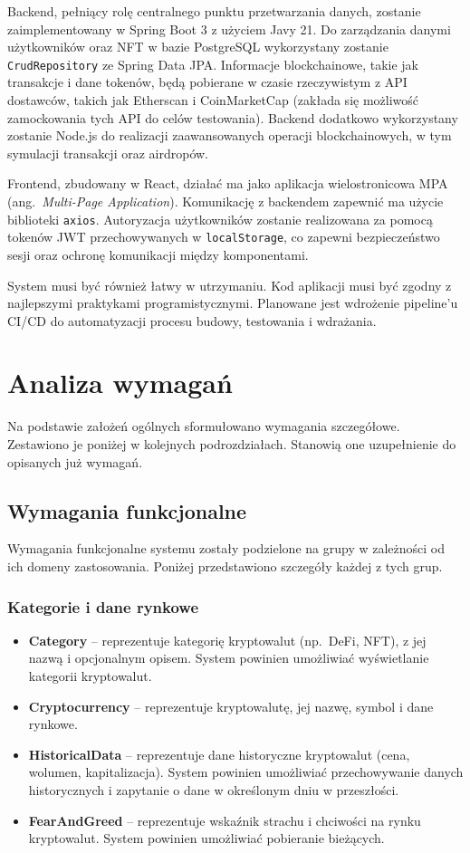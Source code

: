 Backend, pełniący rolę centralnego punktu przetwarzania danych, zostanie zaimplementowany w Spring Boot 3 z użyciem Javy 21. Do zarządzania danymi użytkowników oraz NFT w bazie PostgreSQL wykorzystany zostanie \texttt{CrudRepository} ze Spring Data JPA. Informacje blockchainowe, takie jak transakcje i dane tokenów, będą pobierane w czasie rzeczywistym z API dostawców, takich jak Etherscan i CoinMarketCap (zakłada się możliwość zamockowania tych API do celów testowania). Backend dodatkowo wykorzystany zostanie Node.js do realizacji zaawansowanych operacji blockchainowych, w tym symulacji transakcji oraz airdropów.

Frontend, zbudowany w React, działać ma jako aplikacja wielostronicowa MPA (ang.~\emph{Multi-Page Application}). Komunikację z backendem zapewnić ma użycie biblioteki \texttt{axios}. Autoryzacja użytkowników zostanie realizowana za pomocą tokenów JWT przechowywanych w \texttt{localStorage}, co zapewni bezpieczeństwo sesji oraz ochronę komunikacji między komponentami.

System musi być również łatwy w utrzymaniu. Kod aplikacji musi być zgodny z najlepszymi praktykami programistycznymi. Planowane jest wdrożenie pipeline’u CI/CD do automatyzacji procesu budowy, testowania i wdrażania.


\section{Analiza wymagań}
Na podstawie założeń ogólnych sformułowano wymagania szczegółowe. Zestawiono je poniżej w kolejnych podrozdziałach. Stanowią one uzupełnienie do opisanych już wymagań. 
\subsection{Wymagania funkcjonalne}
Wymagania funkcjonalne systemu zostały podzielone na grupy w zależności od ich domeny zastosowania. Poniżej przedstawiono szczegóły każdej z tych grup.

\subsubsection{Kategorie i dane rynkowe}
\begin{itemize}
\item \textbf{Category} -- reprezentuje kategorię kryptowalut (np.\ DeFi, NFT), z jej nazwą i opcjonalnym opisem. System powinien umożliwiać wyświetlanie kategorii kryptowalut.
\item \textbf{Cryptocurrency} -- reprezentuje kryptowalutę, jej nazwę, symbol i dane rynkowe.
\item \textbf{HistoricalData} -- reprezentuje dane historyczne kryptowalut (cena, wolumen, kapitalizacja). System powinien umożliwiać przechowywanie danych historycznych i zapytanie o dane w określonym dniu w przeszłości.
\item \textbf{FearAndGreed} -- reprezentuje wskaźnik strachu i chciwości na rynku kryptowalut. System powinien umożliwiać pobieranie bieżących.
\end{itemize}

